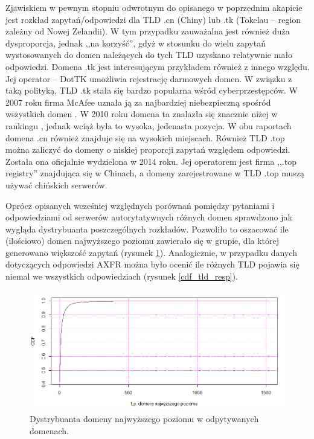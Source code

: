 Zjawiskiem w pewnym stopniu odwrotnym do opisanego w poprzednim akapicie jest rozkład zapytań/odpowiedzi dla TLD .cn (Chiny)
lub .tk (Tokelau -- region zależny od Nowej Zelandii). W tym przypadku zauważalna jest również duża dysproporcja, jednak
,,na korzyść'', gdyż w stosunku do wielu zapytań wystosowanych do domen należących do tych TLD uzyskano relatywnie mało odpowiedzi.
Domena .tk jest interesującym przykładem również z innego względu. Jej operator -- DotTK umożliwia rejestrację darmowych domen.
W związku z taką polityką, TLD .tk stała się bardzo popularna wśród cyberprzestępców. W 2007 roku firma McAfee uznała ją za najbardziej
niebezpieczną spośród wszystkich domen \cite{mcafee2007}. W 2010 roku domena ta znalazła się znacznie niżej w rankingu \cite{mcafee2010}, jednak wciąż
była to wysoka, jedenasta pozycja. W obu raportach domena .cn również znajduje się na wysokich miejscach.
Również TLD .top można zaliczyć do domeny o niskiej proporcji zapytań względem odpowiedzi. Została ona oficjalnie wydzielona
w 2014 roku. Jej operatorem jest firma ,,.top registry'' znajdująca się w Chinach, a domeny zarejestrowane w TLD .top muszą używać
chińskich serwerów.

Oprócz opisanych wcześniej względnych porównań pomiędzy pytaniami i odpowiedziami od serwerów autorytatywnych różnych domen
sprawdzono jak wygląda dystrybuanta poszczególnych rozkładów. Pozwoliło to oszacować ile (ilościowo) domen najwyższego poziomu
zawierało się w grupie, dla której generowano większość zapytań (rysunek \ref{cdf_tld_req}). Analogicznie, w przypadku danych
dotyczących odpowiedzi AXFR można było ocenić ile różnych TLD pojawia się niemal we wszystkich odpowiedziach (rysunek \ref{cdf_tld_resp}).

\begin{figure}[h]
	\centering
	\includegraphics[width=1.0\textwidth]{image/cdf_tld_req_no_title}
	\caption{Dystrybuanta domeny najwyższego poziomu w odpytywanych domenach.}
	\label{cdf_tld_req}
\end{figure}


